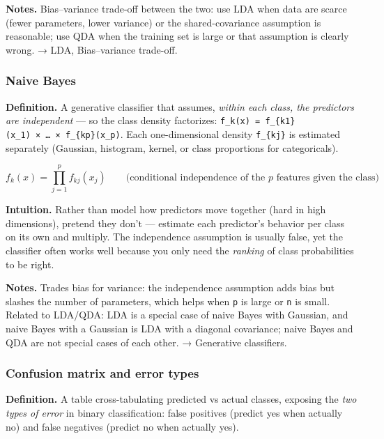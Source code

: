 \documentclass[
  10pt,
  letterpaper,
  onecolumn]{article}
\begin{document}
\textbf{Notes.} Bias--variance trade-off between the two: use LDA when
data are scarce (fewer parameters, lower variance) or the
shared-covariance assumption is reasonable; use QDA when the training
set is large or that assumption is clearly wrong. → LDA, Bias--variance
trade-off.

\hypertarget{naive-bayes}{%
\subsubsection{Naive Bayes}\label{naive-bayes}}

\textbf{Definition.} A generative classifier that assumes, \emph{within
each class, the predictors are independent} --- so the class density
factorizes:
\texttt{f\_k(x)\ =\ f\_\{k1\}(x\_1)\ ×\ …\ ×\ f\_\{kp\}(x\_p)}. Each
one-dimensional density \texttt{f\_\{kj\}} is estimated separately
(Gaussian, histogram, kernel, or class proportions for categoricals).

\begin{equation*}
f_k(x)=\prod_{j=1}^{p}f_{kj}(x_j)
\qquad\text{(conditional independence of the }p\text{ features given the class)}
\end{equation*}

\textbf{Intuition.} Rather than model how predictors move together (hard
in high dimensions), pretend they don't --- estimate each predictor's
behavior per class on its own and multiply. The independence assumption
is usually false, yet the classifier often works well because you only
need the \emph{ranking} of class probabilities to be right.

\textbf{Notes.} Trades bias for variance: the independence assumption
adds bias but slashes the number of parameters, which helps when
\texttt{p} is large or \texttt{n} is small. Related to LDA/QDA: LDA is a
special case of naive Bayes with Gaussian, and naive Bayes with a
Gaussian is LDA with a diagonal covariance; naive Bayes and QDA are not
special cases of each other. → Generative classifiers.

\hypertarget{confusion-matrix-and-error-types}{%
\subsubsection{Confusion matrix and error
types}\label{confusion-matrix-and-error-types}}

\textbf{Definition.} A table cross-tabulating predicted vs actual
classes, exposing the \emph{two types of error} in binary
classification: false positives (predict yes when actually no) and false
negatives (predict no when actually yes).
\end{document}
